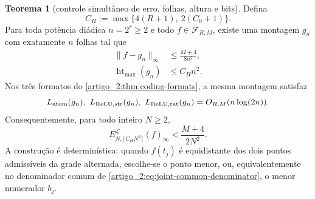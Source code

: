 \documentclass[12pt,a4paper]{article}
\theoremstyle{preciso}
\theoremstyle{definition}
\newcommand{\Library}{\mathcal{L}}
\newcommand{\height}{\operatorname{ht}}
\theoremstyle{preciso}
\newtheorem{theorem}[teorema]{Teorema}
\theoremstyle{preciso}
\theoremstyle{preciso}
\theoremstyle{preciso}
\theoremstyle{definition}
\theoremstyle{preciso}
\theoremstyle{definition}
\theoremstyle{preciso}
\theoremstyle{preciso}
\theoremstyle{definition}
\begin{document}
\begin{theorem}[controle simultâneo de erro, folhas, altura e bits]\label{map:artigo_2:3.16}
\label{artigo_2:thm:joint-budget}
Defina
\begin{equation}
 C_H:=\max\{4(R+1),\ 2(C_0+1)\}.
 \label{artigo_2:eq:joint-height-constant}
\end{equation}
Para toda potência diádica $n=2^r\ge2$ e todo
$f\in\mathcal F_{R,M}$, existe uma montagem $g_n$ com exatamente $n$
folhas tal que
\begin{align}
 \|f-g_n\|_\infty
 &\le\frac{M+4}{8n^2},
 \label{artigo_2:eq:joint-dyadic-error}\\
 \height_{\max}(g_n)&\le C_Hn^2.
 \label{artigo_2:eq:joint-dyadic-height}
\end{align}
Nos três formatos do \cref{artigo_2:thm:coding-formats}, a mesma montagem satisfaz
\begin{equation}
 L_{\rm atom}(g_n),\ L_{\rm ReLU,str}(g_n),\
 L_{\rm ReLU,rat}(g_n)=O_{R,M}(n\log(2n)).
 \label{artigo_2:eq:joint-dyadic-bits}
\end{equation}
Consequentemente, para todo inteiro $N\ge2$,
\begin{equation}
 E_{N,\lceil C_HN^2\rceil}^{\Library}(f)_\infty
 <\frac{M+4}{2N^2}.
 \label{artigo_2:eq:joint-all-N}
\end{equation}
A construção é determinística: quando $f(t_j)$ é equidistante dos dois
pontos admissíveis da grade alternada, escolhe-se o ponto menor, ou,
equivalentemente no denominador comum de \eqref{artigo_2:eq:joint-common-denominator},
o menor numerador $b_j$.
\end{theorem}
\end{document}
